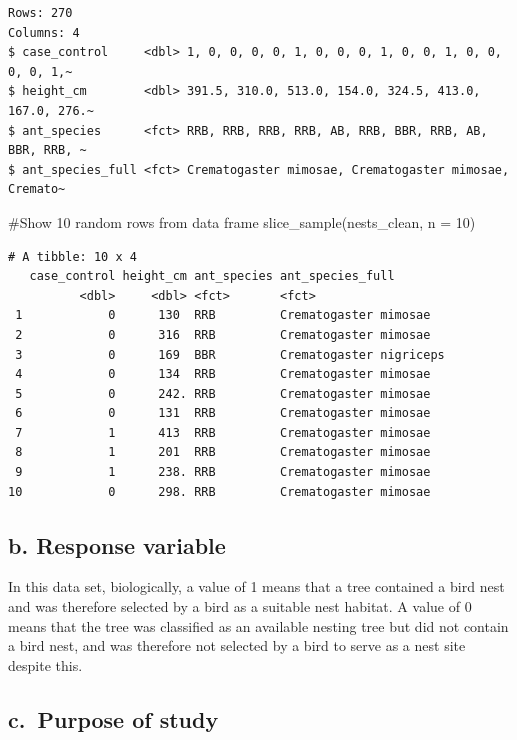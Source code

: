 \documentclass[
  letterpaper,
  DIV=11,
  numbers=noendperiod]{scrartcl}
\newenvironment{Shaded}{\begin{snugshade}}{\end{snugshade}}
\newcommand{\AttributeTok}[1]{\textcolor[rgb]{0.40,0.45,0.13}{#1}}
\newcommand{\CommentTok}[1]{\textcolor[rgb]{0.37,0.37,0.37}{#1}}
\newcommand{\DecValTok}[1]{\textcolor[rgb]{0.68,0.00,0.00}{#1}}
\newcommand{\FunctionTok}[1]{\textcolor[rgb]{0.28,0.35,0.67}{#1}}
\newcommand{\NormalTok}[1]{\textcolor[rgb]{0.00,0.23,0.31}{#1}}
\begin{document}
\begin{verbatim}
Rows: 270
Columns: 4
$ case_control     <dbl> 1, 0, 0, 0, 0, 1, 0, 0, 0, 1, 0, 0, 1, 0, 0, 0, 0, 1,~
$ height_cm        <dbl> 391.5, 310.0, 513.0, 154.0, 324.5, 413.0, 167.0, 276.~
$ ant_species      <fct> RRB, RRB, RRB, RRB, AB, RRB, BBR, RRB, AB, BBR, RRB, ~
$ ant_species_full <fct> Crematogaster mimosae, Crematogaster mimosae, Cremato~
\end{verbatim}

\begin{Shaded}
\begin{Highlighting}[]
\CommentTok{\#Show 10 random rows from data frame}
\FunctionTok{slice\_sample}\NormalTok{(nests\_clean, }\AttributeTok{n =} \DecValTok{10}\NormalTok{)}
\end{Highlighting}
\end{Shaded}

\begin{verbatim}
# A tibble: 10 x 4
   case_control height_cm ant_species ant_species_full       
          <dbl>     <dbl> <fct>       <fct>                  
 1            0      130  RRB         Crematogaster mimosae  
 2            0      316  RRB         Crematogaster mimosae  
 3            0      169  BBR         Crematogaster nigriceps
 4            0      134  RRB         Crematogaster mimosae  
 5            0      242. RRB         Crematogaster mimosae  
 6            0      131  RRB         Crematogaster mimosae  
 7            1      413  RRB         Crematogaster mimosae  
 8            1      201  RRB         Crematogaster mimosae  
 9            1      238. RRB         Crematogaster mimosae  
10            0      298. RRB         Crematogaster mimosae  
\end{verbatim}

\subsection{\texorpdfstring{\textbf{b. Response
variable}}{b. Response variable}}\label{b.-response-variable}

In this data set, biologically, a value of 1 means that a tree contained
a bird nest and was therefore selected by a bird as a suitable nest
habitat. A value of 0 means that the tree was classified as an available
nesting tree but did not contain a bird nest, and was therefore not
selected by a bird to serve as a nest site despite this.

\subsection{\texorpdfstring{\textbf{c.~Purpose of
study}}{c.~Purpose of study}}\label{c.-purpose-of-study}
\end{document}

